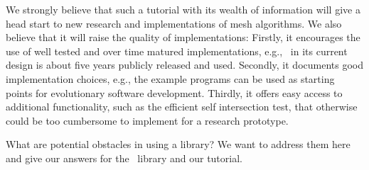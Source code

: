 We strongly believe that such a tutorial with its wealth of
information will give a head start to new research and implementations
of mesh algorithms. We also believe that it will raise the quality of
implementations: Firstly, it encourages the use of well tested and
over time matured implementations, e.g., \cgalpoly\ in its current
design is about five years publicly released and used. Secondly, it
documents good implementation choices, e.g., the example programs can
be used as starting points for evolutionary software development.
Thirdly, it offers easy access to additional functionality, such as
the efficient  self intersection test, that otherwise could be too
cumbersome to implement for a research prototype.

What are potential obstacles in using a library? We want to address
them here and give our answers for the \cgal\ library and our
tutorial. 

